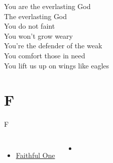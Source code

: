 \documentclass{beamer}
\begin{document}
{\begin{frame}{}
\end{frame}

\hypertarget{Everlasting God['Strength will rise']C}{}
\begin{frame}{}
\fontsize{ 18 }{ 23 }\selectfont

You are the everlasting God\\ 
The everlasting God\\ 
You do not faint\\ 
You won't grow weary\\ 
You're the defender of the weak\\ 
You comfort those in need\\ 
You lift us up on wings like eagles 

\end{frame}

}
\section{F}

\begin{frame}{F}
\begin{columns}
        \begin{itemize}
    \item \hyperlink{Faithful One[]}{Faithful One } \phantom{ 1 1 1 1 1 1 1 1 1 1 1}
\end{itemize}
        \begin{itemize}
            \item[] \phantom{1}\end{itemize}


\end{columns}

\end{frame}
\end{document}
